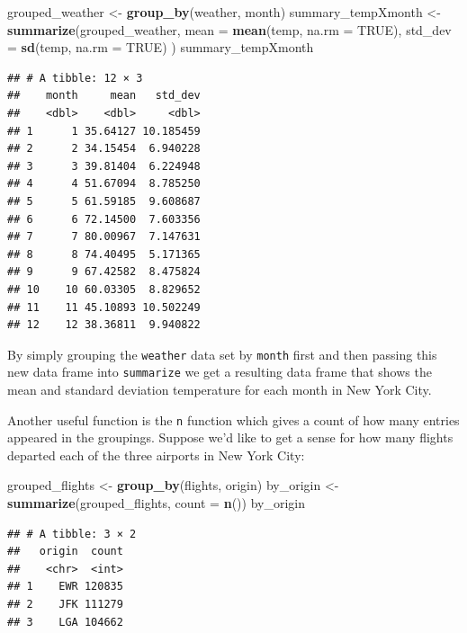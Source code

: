 \documentclass[]{tufte-book}
\newenvironment{Shaded}{\begin{snugshade}}{\end{snugshade}}
\newcommand{\KeywordTok}[1]{\textcolor[rgb]{0.13,0.29,0.53}{\textbf{{#1}}}}
\newcommand{\DataTypeTok}[1]{\textcolor[rgb]{0.13,0.29,0.53}{{#1}}}
\newcommand{\StringTok}[1]{\textcolor[rgb]{0.31,0.60,0.02}{{#1}}}
\newcommand{\OtherTok}[1]{\textcolor[rgb]{0.56,0.35,0.01}{{#1}}}
\newcommand{\NormalTok}[1]{{#1}}
\begin{document}
\begin{Shaded}
\begin{Highlighting}[]
\NormalTok{grouped_weather <-}\StringTok{ }\KeywordTok{group_by}\NormalTok{(weather, month)}
\NormalTok{summary_tempXmonth <-}\StringTok{ }\KeywordTok{summarize}\NormalTok{(grouped_weather,}
          \DataTypeTok{mean =} \KeywordTok{mean}\NormalTok{(temp, }\DataTypeTok{na.rm =} \OtherTok{TRUE}\NormalTok{),}
          \DataTypeTok{std_dev =} \KeywordTok{sd}\NormalTok{(temp, }\DataTypeTok{na.rm =} \OtherTok{TRUE}\NormalTok{)}
          \NormalTok{)}
\NormalTok{summary_tempXmonth}
\end{Highlighting}
\end{Shaded}

\begin{verbatim}
## # A tibble: 12 × 3
##    month     mean   std_dev
##    <dbl>    <dbl>     <dbl>
## 1      1 35.64127 10.185459
## 2      2 34.15454  6.940228
## 3      3 39.81404  6.224948
## 4      4 51.67094  8.785250
## 5      5 61.59185  9.608687
## 6      6 72.14500  7.603356
## 7      7 80.00967  7.147631
## 8      8 74.40495  5.171365
## 9      9 67.42582  8.475824
## 10    10 60.03305  8.829652
## 11    11 45.10893 10.502249
## 12    12 38.36811  9.940822
\end{verbatim}

By simply grouping the \texttt{weather} data set by \texttt{month} first
and then passing this new data frame into \texttt{summarize} we get a
resulting data frame that shows the mean and standard deviation
temperature for each month in New York City.

Another useful function is the \texttt{n} function which gives a count
of how many entries appeared in the groupings. Suppose we'd like to get
a sense for how many flights departed each of the three airports in New
York City:

\begin{Shaded}
\begin{Highlighting}[]
\NormalTok{grouped_flights <-}\StringTok{ }\KeywordTok{group_by}\NormalTok{(flights, origin)}
\NormalTok{by_origin <-}\StringTok{ }\KeywordTok{summarize}\NormalTok{(grouped_flights,}
                       \DataTypeTok{count =} \KeywordTok{n}\NormalTok{())}
\NormalTok{by_origin}
\end{Highlighting}
\end{Shaded}

\begin{verbatim}
## # A tibble: 3 × 2
##   origin  count
##    <chr>  <int>
## 1    EWR 120835
## 2    JFK 111279
## 3    LGA 104662
\end{verbatim}
\end{document}
